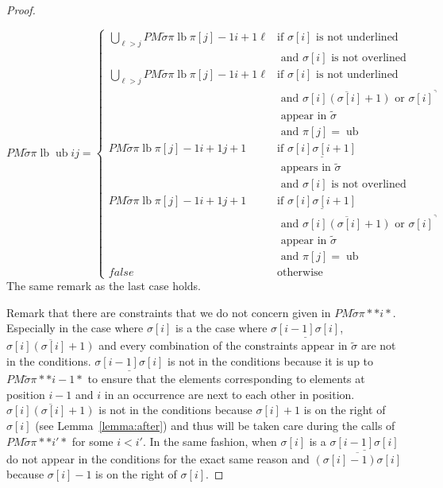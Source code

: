 \documentclass[a4paper]{llncs}
\newcommand{\RLMin}{\text{RLMin}}
\newcommand{\RLMax}{\text{RLMax}}
\newcommand{\ptext}{\pi}
\newcommand{\ppattern}{\sigma}
\newcommand{\PM}{PM}
\DeclareMathOperator{\lb}{lb}
\DeclareMathOperator{\ub}{ub}
\begin{document}
\begin{proof}
\begin{itemize}
	$$
	\PM{\widetilde{\sigma}}{\ptext}{\lb}{\ub}{i}{j}=
	\begin{cases}
			\bigcup_{\ell>j} \PM{\widetilde{\sigma}}{\ptext}{\lb}{\ptext[j]-1}{i+1}{\ell}
				& \text{if $\ppattern[i]$ is not underlined } \\
				& \text{ and $\ppattern[i]$ is not overlined} \\
			\bigcup_{\ell>j} \PM{\widetilde{\sigma}}{\ptext}{\lb}{\ptext[j]-1}{i+1}{\ell}
				& \text{if $\ppattern[i]$ is not underlined } \\
				& \text{ and $\overline{\ppattern[i](\ppattern[i]+1)}$ or ${\ppattern[i]}^\urcorner$}\\
				& \text{ appear in $\widetilde{\sigma}$}\\
				& \text{ and $\ptext[j]=\ub$} \\
			\PM{\widetilde{\sigma}}{\ptext}{\lb}{\ptext[j]-1}{i+1}{j+1}
				& \text{if $\underline{\ppattern[i]\ppattern[i+1]}$ } \\
				& \text{ appears in $\widetilde{\sigma}$}\\
				& \text{ and $\ppattern[i]$ is not overlined} \\
			\PM{\widetilde{\sigma}}{\ptext}{\lb}{\ptext[j]-1}{i+1}{j+1}
				& \text{if $\underline{\ppattern[i]\ppattern[i+1]}$ } \\
				& \text{ and $\overline{\ppattern[i](\ppattern[i]+1)}$ or ${\ppattern[i]}^\urcorner$}\\
				& \text{ appear in $\widetilde{\sigma}$}\\
				& \text{ and $\ptext[j]=\ub$} \\
			false & \text{otherwise}
	\end{cases}
	$$
	The same remark as the last case holds.
\end{itemize}

Remark that there are constraints that we do not concern given in
$\PM{\widetilde{\sigma}}{\ptext}{*}{*}{i}{*}$.
Especially in the case where $\sigma[i]$ is a \RLMin
the case where $\underline{\sigma[i-1]\sigma[i]}$,
$\overline{\ppattern[i](\ppattern[i]+1)}$
and every combination of the constraints
appear in $\widetilde{\sigma}$
are not in the conditions.
$\underline{\sigma[i-1]\sigma[i]}$ is not
in the conditions because it is
up to $\PM{\widetilde{\sigma}}{\ptext}{*}{*}{i-1}{*}$
to ensure that the elements corresponding to elements at position $i-1$ and $i$ in an occurrence are next to each other in position.
$\overline{\ppattern[i](\ppattern[i]+1)}$ is not
in the conditions because $\sigma[i]+1$ is on the right
of $\sigma[i]$ (see Lemma~\ref{lemma:after})
and thus will
be taken care
during the calls of $\PM{\widetilde{\sigma}}{\ptext}{*}{*}{i'}{*}$
for some $i<i'$.
In the same fashion,
when $\sigma[i]$ is a \RLMax $\underline{\sigma[i-1]\sigma[i]}$
do not appear in the conditions for the exact same reason
and $\overline{(\ppattern[i]-1)\ppattern[i]}$
because $\sigma[i]-1$ is on the right of $\sigma[i]$.


\end{proof}
\end{document}
